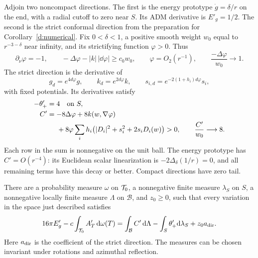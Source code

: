 Adjoin two noncompact directions. The first is the energy prototype
\(\dot g=\delta/r\) on the end, with a radial cutoff to zero near \(S\).
Its ADM derivative is \(E'_g=1/2\). The second is the strict conformal
direction from the preparation for Corollary~\ref{d:numerical}. Fix
\(0<\delta<1\), a positive smooth weight \(w_0\) equal to
\(r^{-3-\delta}\) near infinity, and its strictifying function
\(\varphi>0\). Thus
\[
 \partial_\nu\varphi=-1,\qquad
 -\Delta\varphi-|k|\,|\dd\varphi|\geq c_0w_0,\qquad
 \varphi=O_2(r^{-1}),\qquad
 \frac{-\Delta\varphi}{w_0}\longrightarrow1.
\]
The strict direction is the derivative of
\[
 g_d=e^{4d\varphi}g,\qquad k_d=e^{2d\varphi}k,\qquad
 s_{i,d}=e^{-2(1+h_i)d\varphi}s_i,
\]
with fixed potentials. Its derivatives satisfy
\begin{equation}
\label{j:strict-direction}
 \begin{split}
 -\theta_+'&=4\quad\text{on }S,\\
 C'&=-8\Delta\varphi+8k(w,\nabla\varphi)\\
   &\hspace{1.4em}
       +8\varphi\sum_i h_i
                  \bigl(|D_i|^2+s_i^2+2s_iD_i(w)\bigr)>0,
 \qquad \frac{C'}{w_0}\longrightarrow8.
 \end{split}
\end{equation}
Each row in the sum is nonnegative on the unit ball. The energy
prototype has \(C'=O(r^{-4})\): its Euclidean scalar linearization is
\(-2\Delta_\delta(1/r)=0\), and all remaining terms have this decay or
better. Compact directions have zero tail.

\begin{lemma}
\label{j:multipliers}
There are a probability measure \(\omega\) on \(\mathcal T_0\), a nonnegative
finite measure \(\lambda_S\) on \(S\), a nonnegative locally finite
measure \(\Lambda\) on \(\mathcal B\), and \(z_0\geq0\), such that
every variation in the space just described satisfies
\begin{equation}
\label{j:multiplier-identity}
 16\pi E'_g-c\int_{\mathcal T_0} A'_T\,\mathrm d\omega(T)
 =\int_{\mathcal B}C'\,\mathrm d\Lambda
       -\int_S\theta_+'\mathrm d\lambda_S+z_0a_{\rm dir}.
\end{equation}
Here \(a_{\rm dir}\) is the coefficient of the strict direction.
The measures can be chosen invariant under rotations and azimuthal
reflection.
\end{lemma}

